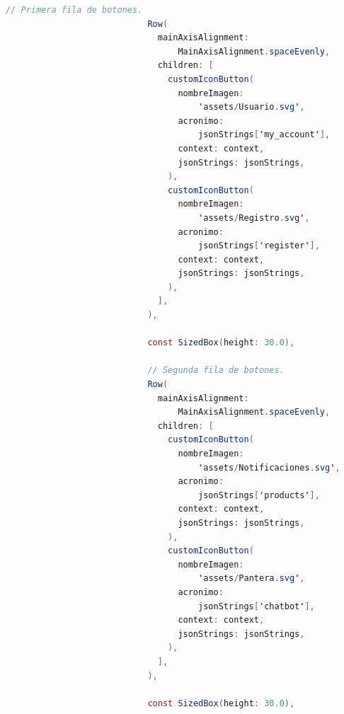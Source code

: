 \begin{enumerate}
\begin{lstlisting}[language=Java, caption={Screen welcome page completo}]
                            // Primera fila de botones.
                            Row(
                              mainAxisAlignment:
                                  MainAxisAlignment.spaceEvenly,
                              children: [
                                customIconButton(
                                  nombreImagen:
                                      'assets/Usuario.svg',
                                  acronimo:
                                      jsonStrings['my_account'],
                                  context: context,
                                  jsonStrings: jsonStrings,
                                ),
                                customIconButton(
                                  nombreImagen:
                                      'assets/Registro.svg',
                                  acronimo:
                                      jsonStrings['register'],
                                  context: context,
                                  jsonStrings: jsonStrings,
                                ),
                              ],
                            ),

                            const SizedBox(height: 30.0),

                            // Segunda fila de botones.
                            Row(
                              mainAxisAlignment:
                                  MainAxisAlignment.spaceEvenly,
                              children: [
                                customIconButton(
                                  nombreImagen:
                                      'assets/Notificaciones.svg',
                                  acronimo:
                                      jsonStrings['products'],
                                  context: context,
                                  jsonStrings: jsonStrings,
                                ),
                                customIconButton(
                                  nombreImagen:
                                      'assets/Pantera.svg',
                                  acronimo:
                                      jsonStrings['chatbot'],
                                  context: context,
                                  jsonStrings: jsonStrings,
                                ),
                              ],
                            ),

                            const SizedBox(height: 30.0),


\end{lstlisting}
\end{enumerate}
